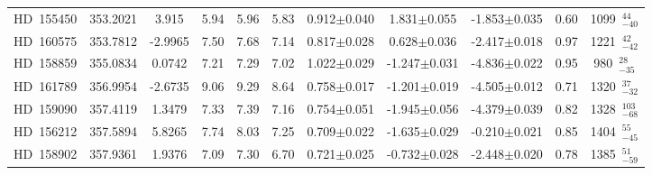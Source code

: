 {\begin{longtable}{lcccccccccc}
HD~155450 & 353.2021 & 3.915 & 5.94 & 5.96 & 5.83 & 0.912$\pm$0.040 & 1.831$\pm$0.055 & -1.853$\pm$0.035 & 0.60 & 1099~$_{-40}^{44}$ \\
\noalign{\smallskip}
HD~160575 & 353.7812 & -2.9965 & 7.50 & 7.68 & 7.14 & 0.817$\pm$0.028 & 0.628$\pm$0.036 & -2.417$\pm$0.018 & 0.97 & 1221~$_{-42}^{42}$ \\
\noalign{\smallskip}
HD~158859 & 355.0834 & 0.0742 & 7.21 & 7.29 & 7.02 & 1.022$\pm$0.029 & -1.247$\pm$0.031 & -4.836$\pm$0.022 & 0.95 & 980~$_{-35}^{28}$ \\
\noalign{\smallskip}
HD~161789 & 356.9954 & -2.6735 & 9.06 & 9.29 & 8.64 & 0.758$\pm$0.017 & -1.201$\pm$0.019 & -4.505$\pm$0.012 & 0.71 & 1320~$_{-32}^{37}$ \\
\noalign{\smallskip}
HD~159090 & 357.4119 & 1.3479 & 7.33 & 7.39 & 7.16 & 0.754$\pm$0.051 & -1.945$\pm$0.056 & -4.379$\pm$0.039 & 0.82 & 1328~$_{-68}^{103}$ \\
\noalign{\smallskip}
HD~156212 & 357.5894 & 5.8265 & 7.74 & 8.03 & 7.25 & 0.709$\pm$0.022 & -1.635$\pm$0.029 & -0.210$\pm$0.021 & 0.85 & 1404~$_{-45}^{55}$ \\
\noalign{\smallskip}
HD~158902 & 357.9361 & 1.9376 & 7.09 & 7.30 & 6.70 & 0.721$\pm$0.025 & -0.732$\pm$0.028 & -2.448$\pm$0.020 & 0.78 & 1385~$_{-59}^{51}$ \\

\end{longtable}
}
